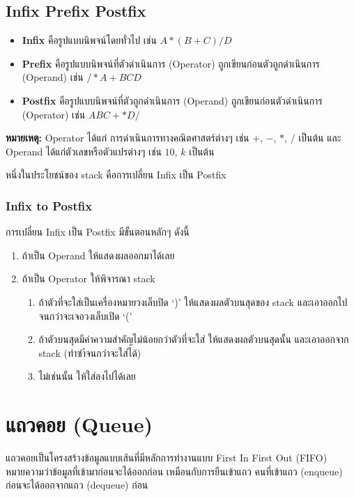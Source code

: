 \newpage

\subsection{Infix Prefix Postfix}

\begin{itemize}
\item \textbf{Infix} คือรูปแบบนิพจน์โดยทั่วไป เช่น $A * ( B + C ) / D$
\item \textbf{Prefix} คือรูปแบบนิพจน์ที่ตัวดำเนินการ (Operator) ถูกเขียนก่อนตัวถูกดำเนินการ (Operand) เช่น $/ * A + B C D$
\item \textbf{Postfix} คือรูปแบบนิพจน์ที่ตัวถูกดำเนินการ (Operand) ถูกเขียนก่อนตัวดำเนินการ (Operator) เช่น $A B C + * D /$
\end{itemize}

\textbf{หมายเหตุ:} Operator ได้แก่ การดำเนินการทางคณิตศาสตร์ต่างๆ เช่น $+$, $-$, $*$, $/$ เป็นต้น และ Operand ได้แก่ตัวเลขหรือตัวแปรต่างๆ เช่น $10$, $k$ เป็นต้น

หนึ่งในประโยชน์ของ stack คือการเปลี่ยน Infix เป็น Postfix

\subsubsection{Infix to Postfix}

การเปลี่ยน Infix เป็น Postfix มีขั้นตอนหลักๆ ดังนี้
\begin{enumerate}
\item ถ้าเป็น Operand ให้แสดงผลออกมาได้เลย
\item ถ้าเป็น Operator ให้พิจารณา stack
		\begin{enumerate}
\item ถ้าตัวที่จะใส่เป็นเครื่องหมายวงเล็บปิด `)' ให้แสดงผลตัวบนสุดของ stack และเอาออกไปจนกว่าจะเจอวงเล็บเปิด `('
\item ถ้าตัวบนสุดมีค่าความสำคัญไม่น้อยกว่าตัวที่จะใส่ ให้แสดงผลตัวบนสุดนั้น และเอาออกจาก stack (ทำซำ้จนกว่าจะใส่ได้)
\item ไม่เช่นนั้น ให้ใส่ลงไปได้เลย
		\end{enumerate}
\end{enumerate}



\section{แถวคอย (Queue)}

แถวคอยเป็นโครงสร้างข้อมูลแบบเส้นที่มีหลักการทำงานแบบ First In First Out (FIFO) หมายความว่าข้อมูลที่เข้ามาก่อนจะได้ออกก่อน เหมือนกับการยืนเข้าแถว คนที่เข้าแถว (enqueue) ก่อนจะได้ออกจากแถว (dequeue) ก่อน

